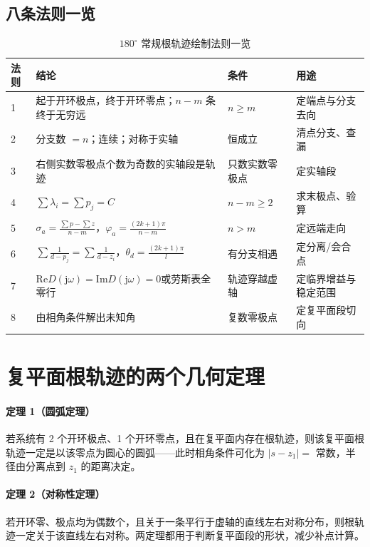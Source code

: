 \subsection{八条法则一览}
{\renewcommand{\arraystretch}{1.3}\setlength{\tabcolsep}{6pt}
\begin{table}[htbp]
\centering
\caption{$180^\circ$ 常规根轨迹绘制法则一览}
\begin{tabular}{@{}p{1.0cm}p{5.7cm}p{3.2cm}p{4.0cm}@{}}
\toprule
法则 & 结论 & 条件 & 用途 \\
\midrule
1 & 起于开环极点，终于开环零点；$n-m$ 条终于无穷远 & $n\ge m$ & 定端点与分支去向 \\
2 & 分支数 $=n$；连续；对称于实轴 & 恒成立 & 清点分支、查漏 \\
3 & 右侧实数零极点个数为奇数的实轴段是轨迹 & 只数实数零极点 & 定实轴段 \\
4 & $\sum\lambda_i=\sum p_j=C$ & $n-m\ge2$ & 求末极点、验算 \\
5 & $\sigma_a=\frac{\sum p-\sum z}{n-m}$，\newline $\varphi_a=\frac{(2k+1)\pi}{n-m}$ & $n>m$ & 定远端走向 \\
6 & $\sum\frac{1}{d-p_j}=\sum\frac{1}{d-z_i}$，\newline $\theta_d=\frac{(2k+1)\pi}{l}$ & 有分支相遇 & 定分离/会合点 \\
7 & $\mathrm{Re}D(\mathrm{j}\omega)=\mathrm{Im}D(\mathrm{j}\omega)=0$\newline 或劳斯表全零行 & 轨迹穿越虚轴 & 定临界增益与稳定范围 \\
8 & 由相角条件解出未知角 & 复数零极点 & 定复平面段切向 \\
\bottomrule
\end{tabular}
\end{table}}

\medskip

\section{复平面根轨迹的两个几何定理}
\paragraph{定理 1（圆弧定理）}若系统有 2 个开环极点、1 个开环零点，且在复平面内存在根轨迹，则该复平面根轨迹一定是以该零点为圆心的圆弧——此时相角条件可化为 $|s-z_1|=$ 常数，半径由分离点到 $z_1$ 的距离决定。

\paragraph{定理 2（对称性定理）}若开环零、极点均为偶数个，且关于一条平行于虚轴的直线左右对称分布，则根轨迹一定关于该直线左右对称。两定理都用于判断复平面段的形状，减少补点计算。

